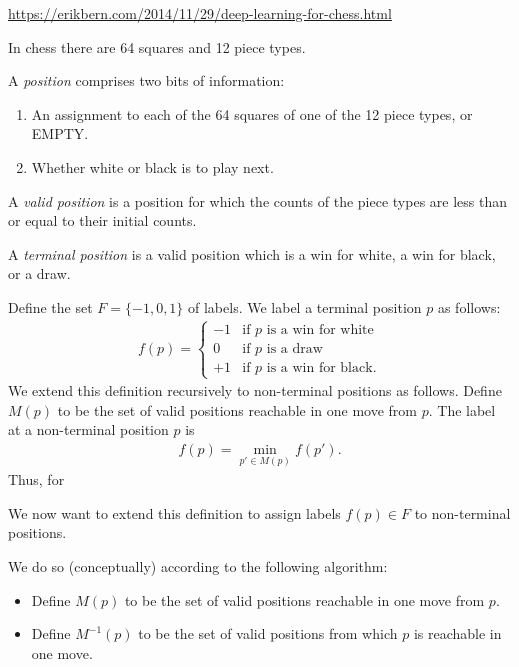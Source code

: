 \url{https://erikbern.com/2014/11/29/deep-learning-for-chess.html}

In chess there are 64 squares and 12 piece types.

\begin{definition}
  A {\it position} comprises two bits of information:
  \begin{enumerate}
  \item An assignment to each of the 64 squares of one of the 12 piece types, or EMPTY.
  \item Whether white or black is to play next.
  \end{enumerate}
  A {\it valid position} is a position for which the counts of the piece types are less than or equal to their initial counts.

  A {\it terminal position} is a valid position which is a win for white, a win for black, or a draw.
\end{definition}
Define the set $F = \{-1, 0, 1\}$ of labels. We label a terminal position $p$ as follows:
\begin{align*}
  f(p) =
  \begin{cases}
  -1 & \text{if $p$ is a win for white} \\
  0  & \text{if $p$ is a draw} \\
  +1 & \text{if $p$ is a win for black}.
  \end{cases}
\end{align*}
We extend this definition recursively to non-terminal positions as follows. Define $M(p)$ to be the set of
valid positions reachable in one move from $p$. The label at a non-terminal position $p$ is
\begin{align*}
  f(p) = \min_{p' \in M(p)} f(p').
\end{align*}
Thus, for

We now want to extend this definition to assign labels $f(p) \in F$ to non-terminal positions.

We do so (conceptually) according to the following algorithm:

\begin{definition*}
  \begin{itemize}
  \item Define $M(p)$ to be the set of valid positions reachable in one move from $p$.
  \item Define $M^{-1}(p)$ to be the set of valid positions from which $p$ is reachable in one move.
  \end{itemize}
\end{definition*}

